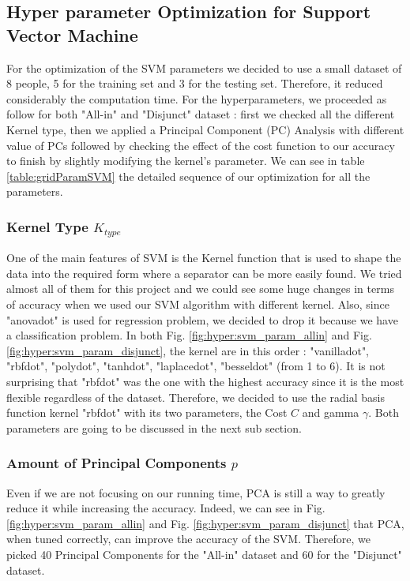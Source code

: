 \documentclass[conference]{IEEEtran}
\begin{document}
\subsection{Hyper parameter Optimization for Support Vector Machine}\label{sec:hyper:svm}
\textcolor{maxim}{
    For the optimization of the SVM parameters we decided to use a small dataset of 8 people, 5 for the training set and 3 for the testing set. Therefore, it reduced considerably the computation time. For the hyperparameters, we proceeded as follow for both "All-in" and "Disjunct" dataset : first we checked all the different Kernel type, then we applied a Principal Component (PC) Analysis with different value of PCs followed by checking the effect of the cost function to our accuracy to finish by slightly modifying the kernel's parameter. We can see in table \ref{table:gridParamSVM} the detailed sequence of our optimization for all the parameters.
    \subsubsection{Kernel Type $K_{type}$}
    One of the main features of SVM is the Kernel function that is used to shape the data into the required form where a separator can be more easily found. We tried almost all of them for this project and we could see some huge changes in terms of accuracy when we used our SVM algorithm with different kernel. Also, since "anovadot" is used for regression problem, we decided to drop it because we have a classification problem.
    In both Fig. \ref{fig:hyper:svm_param_allin} and Fig. \ref{fig:hyper:svm_param_disjunct}, the kernel are in this order : "vanilladot", "rbfdot", "polydot", "tanhdot", "laplacedot", "besseldot" (from 1 to 6).
    It is not surprising that "rbfdot" was the one with the highest accuracy since it is the most flexible regardless of the dataset. Therefore, we decided to use the radial basis function kernel "rbfdot" with its two parameters, the Cost $C$ and gamma $\gamma$. Both parameters are going to be discussed in the next sub section.
    \subsubsection{Amount of Principal Components $p$}
    Even if we are not focusing on our running time, PCA is still a way to greatly reduce it while increasing the accuracy. Indeed, we can see in Fig. \ref{fig:hyper:svm_param_allin} and Fig. \ref{fig:hyper:svm_param_disjunct} that PCA, when tuned correctly, can improve the accuracy of the SVM. Therefore, we picked 40 Principal Components for the "All-in" dataset and 60 for the "Disjunct" dataset.
}
\end{document}
